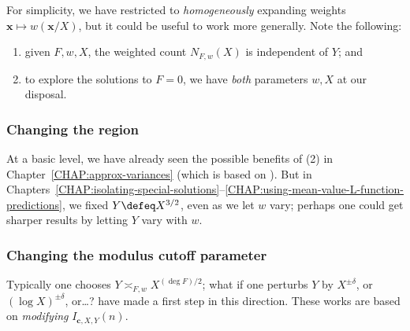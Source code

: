 \documentclass[12pt]{report}
\begin{document}
For simplicity,
we have restricted to \emph{homogeneously} expanding weights $\bm{x}\mapsto w(\bm{x}/X)$,
but it could be useful to work more generally.
Note the following:
\begin{enumerate}[(1)]
    \item given $F,w,X$,
    the weighted count $N_{F,w}(X)$ is independent of $Y$;
    and
    
    \item to explore the solutions to $F=0$,
    we have \emph{both} parameters $w,X$ at our disposal.
\end{enumerate}

\subsubsection{Changing the region}

At a basic level,
we have already seen the possible benefits of (2) in Chapter~\ref{CHAP:approx-variances} (which is based on \cite{diaconu2019admissible}).
But in Chapters~\ref{CHAP:isolating-special-solutions}--\ref{CHAP:using-mean-value-L-function-predictions},
we fixed $Y\defeq X^{3/2}$, even as we let $w$ vary;
perhaps one could get sharper results by letting $Y$ vary with $w$.



\subsubsection{Changing the modulus cutoff parameter}

Typically one chooses $Y\asymp_{F,w}X^{(\deg{F})/2}$;
what if one perturbs $Y$
by $X^{\pm\delta}$,
or $(\log{X})^{\pm\delta}$, or\dots?
\cites{munshi2015pairs,marmon2019hasse} have made a first step in this direction.
These works are based on \emph{modifying} $I_{\bm{c},X,Y}(n)$.
\end{document}
